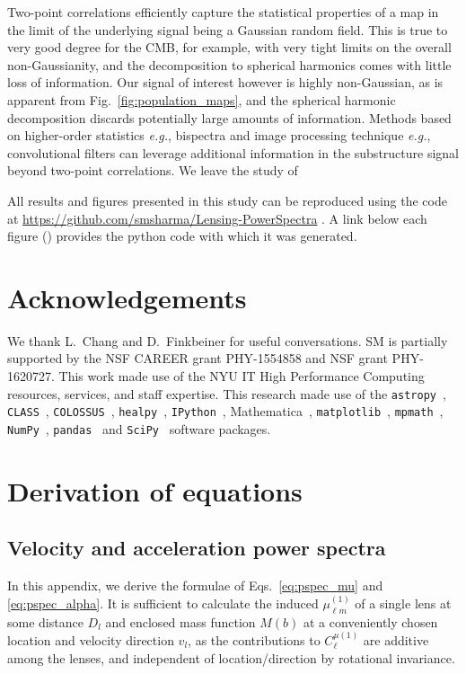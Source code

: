 \documentclass[twocolumn]{aastex63}
\begin{document}
Two-point correlations efficiently capture the statistical properties of a map in the limit of the underlying signal being a Gaussian random field. This is true to very good degree for the CMB, for example, with very tight limits on the overall non-Gaussianity, and the decomposition to spherical harmonics comes with little loss of information. Our signal of interest however is highly non-Gaussian, as is apparent from Fig.~\ref{fig:population_maps}, and the spherical harmonic decomposition discards potentially large amounts of information. Methods based on higher-order statistics \emph{e.g.}, bispectra and image processing technique \emph{e.g.}, convolutional filters can leverage additional information in the substructure signal beyond two-point correlations. We leave the study of 

All results and figures presented in this study can be reproduced using the code at \url{https://github.com/smsharma/Lensing-PowerSpectra} \href{https://github.com/smsharma/Lensing-PowerSpectra}{\faGithub}. A link below each figure (\faFileCodeO) provides the python code with which it was generated.

\clearpage
\section*{Acknowledgements}
We thank L.~Chang and D.~Finkbeiner for useful conversations. SM is partially supported by the NSF CAREER grant PHY-1554858 and NSF grant PHY-1620727. This work made use of the NYU IT High Performance Computing resources, services, and staff expertise.
 This research made use of the \texttt{astropy}~\cite{2013A&A...558A..33A,2018AJ....156..123A}, \texttt{CLASS}~\cite{Blas:2011rf}, \texttt{COLOSSUS}~\cite{2018ApJS..239...35D}, \texttt{healpy}~\cite{2005ApJ...622..759G}, \texttt{IPython}~\cite{PER-GRA:2007}, Mathematica~\cite{Mathematica}, \texttt{matplotlib}~\cite{Hunter:2007}, \texttt{mpmath}~\cite{mpmath}, \texttt{NumPy}~\cite{numpy:2011}, \texttt{pandas}~\cite{pandas:2010} and \texttt{SciPy}~\cite{Jones:2001ab} software packages. 

\appendix 

\section{Derivation of equations}
\label{app:derivations}

\subsection{Velocity and acceleration power spectra}
In this appendix, we derive the formulae of Eqs.~\ref{eq:pspec_mu} and \ref{eq:pspec_alpha}. It is sufficient to calculate the induced $\mu_{\ell m}^{(1)}$ of a single lens at some distance $D_l$ and enclosed mass function $M(b)$ at a conveniently chosen location and velocity direction $\hat{v}_l$, as the contributions to $C^{\mu(1)}_\ell$ are additive among the lenses, and independent of location/direction by rotational invariance.
\end{document}
